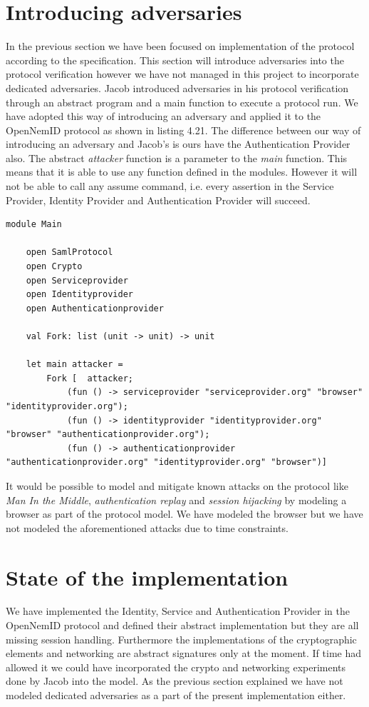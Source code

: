 \documentclass[twosided]{report}
\begin{document}
\section{Introducing adversaries}
In the previous section we have been focused on implementation of the protocol according to the specification. This section will introduce adversaries into the protocol verification however we have not managed in this project to incorporate dedicated adversaries. Jacob introduced adversaries in his protocol verification through an abstract program and a main function to execute a protocol run. We have adopted this way of introducing an adversary and applied it to the OpenNemID protocol as shown in listing 4.21. The difference between our way of introducing an adversary and Jacob's is ours have the Authentication Provider also. The abstract \emph{attacker} function is a parameter to the \emph{main} function. This means that it is able to use any function defined in the modules. However it will not be able to call any assume command, i.e. every assertion in the Service Provider, Identity Provider and Authentication Provider will succeed.
\begin{lstlisting}[style=fstar, caption={Main module for introducing adversaries}]
	module Main

	open SamlProtocol
	open Crypto
	open Serviceprovider
	open Identityprovider
	open Authenticationprovider

	val Fork: list (unit -> unit) -> unit	

	let main attacker =	
		Fork [	attacker;
			(fun () -> serviceprovider "serviceprovider.org" "browser" "identityprovider.org");
			(fun () -> identityprovider "identityprovider.org" "browser" "authenticationprovider.org");
			(fun () -> authenticationprovider "authenticationprovider.org" "identityprovider.org" "browser")]
\end{lstlisting}
It would be possible to model and mitigate known attacks on the protocol like \emph{Man In the Middle}, \emph{authentication replay} and \emph{session hijacking} by modeling a browser as part of the protocol model. We have modeled the browser but we have not modeled the aforementioned attacks due to time constraints.

\section{State of the implementation}
We have implemented the Identity, Service and Authentication Provider in the OpenNemID protocol and defined their abstract implementation but they are all missing session handling. Furthermore the implementations of the cryptographic elements and networking are abstract signatures only at the moment. If time had allowed it we could have incorporated the crypto and networking experiments done by Jacob into the model. As the previous section explained we have not modeled dedicated adversaries as a part of the present implementation either.
\end{document}
